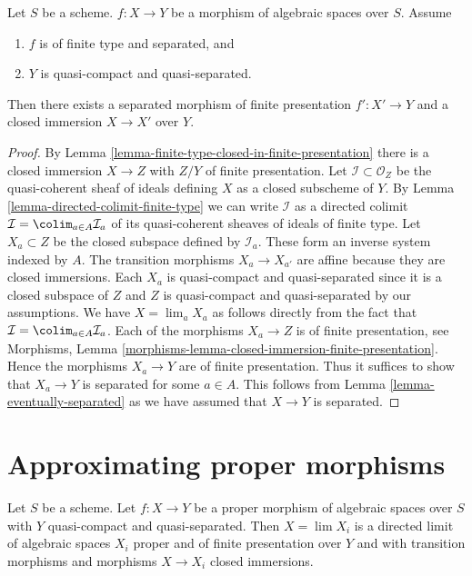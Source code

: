\begin{proposition}
\label{proposition-separated-closed-in-finite-presentation}
Let $S$ be a scheme. $f : X \to Y$ be a morphism of algebraic spaces
over $S$. Assume
\begin{enumerate}
\item $f$ is of finite type and separated, and
\item $Y$ is quasi-compact and quasi-separated.
\end{enumerate}
Then there exists a separated morphism of finite presentation
$f' : X' \to Y$ and a closed immersion $X \to X'$ over $Y$.
\end{proposition}

\begin{proof}
By Lemma \ref{lemma-finite-type-closed-in-finite-presentation}
there is a closed immersion $X \to Z$ with $Z/Y$ of
finite presentation. Let $\mathcal{I} \subset \mathcal{O}_Z$
be the quasi-coherent sheaf of ideals defining $X$ as a closed
subscheme of $Y$. By
Lemma \ref{lemma-directed-colimit-finite-type}
we can write $\mathcal{I}$ as a directed colimit
$\mathcal{I} = \colim_{a \in A} \mathcal{I}_a$ of its
quasi-coherent sheaves of ideals of finite type.
Let $X_a \subset Z$ be the closed subspace defined by $\mathcal{I}_a$.
These form an inverse system indexed by $A$.
The transition morphisms $X_a \to X_{a'}$ are affine because
they are closed immersions. Each $X_a$ is quasi-compact and quasi-separated
since it is a closed subspace of $Z$ and $Z$ is quasi-compact and
quasi-separated by our assumptions.
We have $X = \lim_a X_a$ as follows directly from the
fact that $\mathcal{I} = \colim_{a \in A} \mathcal{I}_a$.
Each of the morphisms $X_a \to Z$ is of finite presentation, see
Morphisms, Lemma \ref{morphisms-lemma-closed-immersion-finite-presentation}.
Hence the morphisms $X_a \to Y$ are of finite presentation.
Thus it suffices to show that $X_a \to Y$ is separated for some
$a \in A$. This follows from Lemma \ref{lemma-eventually-separated}
as we have assumed that $X \to Y$ is separated.
\end{proof}






\section{Approximating proper morphisms}
\label{section-approximate-proper}

\begin{lemma}
\label{lemma-proper-limit-of-proper-finite-presentation}
Let $S$ be a scheme. Let $f : X \to Y$ be a proper morphism of algebraic
spaces over $S$ with $Y$ quasi-compact and quasi-separated. Then
$X = \lim X_i$ is a directed limit of algebraic spaces $X_i$
proper and of finite presentation over $Y$ and with transition
morphisms and morphisms $X \to X_i$ closed immersions.
\end{lemma}

